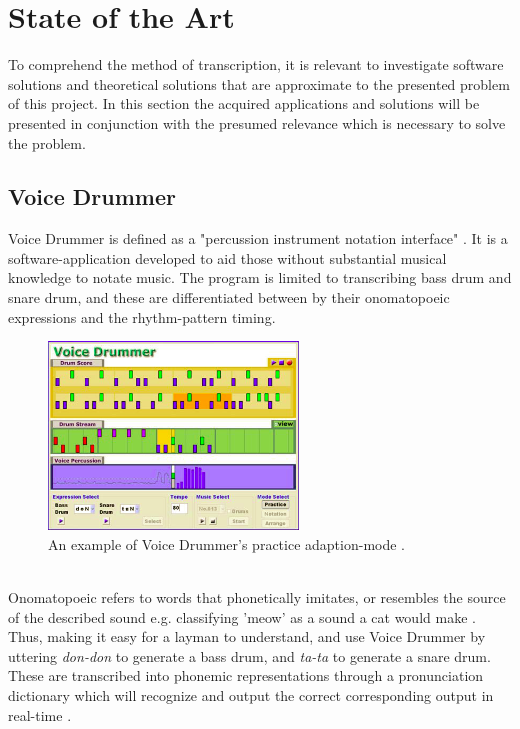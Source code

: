 \section{ State of the Art }
To comprehend the method of transcription, it is relevant to investigate software solutions and theoretical solutions that are approximate to the presented problem of this project. In this section the acquired applications and solutions will be presented in conjunction with the presumed relevance which is necessary to solve the problem.

\subsection{ Voice Drummer }
Voice Drummer is defined as a "percussion instrument notation interface"  \citep{VoiceDrummer}. It is a software-application developed to aid those without substantial musical knowledge to notate music. The program is limited to transcribing bass drum and snare drum, and these are differentiated between by their onomatopoeic expressions and the rhythm-pattern timing.
\\
\begin{figure}[h]
	\begin{center}
		\includegraphics[height=5cm]{fig/VoiceDrummer.png}
		\caption{An example of Voice Drummer's practice adaption-mode \citep{VoiceDrummer}.}
		\label{VoiceDrummer}
	\end{center}
\end{figure}
\\
Onomatopoeic refers to words that phonetically imitates, or resembles the source of the described sound e.g. classifying 'meow' as a sound a cat would make \citep{VoiceDrummer}. Thus, making it easy for a layman to understand, and use Voice Drummer by uttering \textit{don-don} to generate a bass drum, and \textit{ta-ta} to generate a snare drum. These are transcribed into phonemic representations through a pronunciation dictionary which will recognize and output the correct corresponding output in real-time \citep{VoiceDrummer}.

